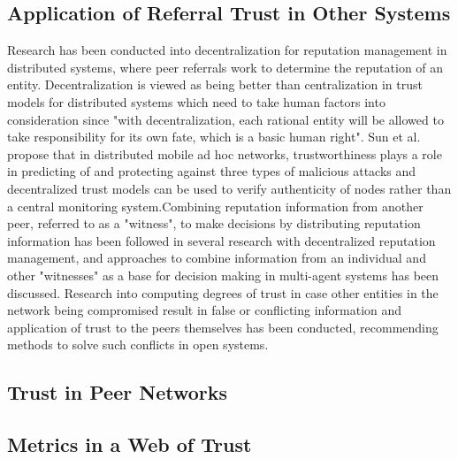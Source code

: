 \subsection{Application of Referral Trust in Other Systems}
Research has been conducted into decentralization for reputation management in distributed systems, where peer referrals work to determine the reputation of an entity. Decentralization is viewed as being better than centralization in trust models for distributed systems which need to take human factors into consideration since "with decentralization, each rational entity will be allowed to take responsibility for its own fate, which is a basic human right"\cite{abdul1997using}. Sun et al. propose that in distributed mobile ad hoc networks, trustworthiness plays a role in predicting of and protecting against three types of malicious attacks and decentralized trust models can be used to verify authenticity of nodes rather than a central monitoring system\cite{sun2008defense}.Combining reputation information from another peer, referred to as a "witness"\cite{yu2000social}\cite{yu2002evidential}, to make decisions by distributing reputation information has been followed in several research with decentralized reputation management, and approaches to combine information from an individual and other "witnesses" as a base for decision making in multi-agent systems has been discussed\cite{sabater2002reputation}. Research into computing degrees of trust in case other entities in the network being compromised result in false or conflicting information and application of trust to the peers themselves has been conducted, recommending methods to solve such conflicts in open systems\cite{beth1994valuation}.

\subsection{Trust in Peer Networks}

\subsection{Metrics in a Web of Trust}

